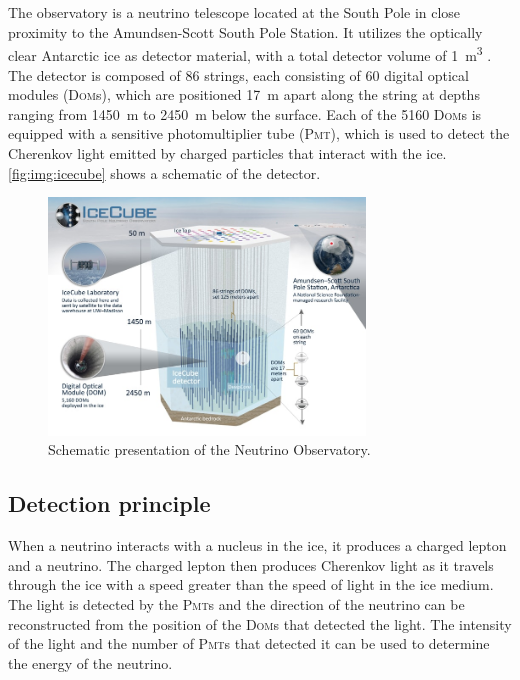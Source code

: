 \section{\icecube}
The \icecube{} observatory is a neutrino telescope located at the South Pole
in close proximity to the Amundsen-Scott South Pole Station.
It utilizes the optically clear Antarctic ice as detector material,
  with a total detector volume of \SI{1}{\cubic\meter} \cite{icecube_facts}.
The detector is composed of \num{86} strings,
  each consisting of \num{60} digital optical modules (\textsc{Dom}s),
    which are positioned
      \SI{17}{\meter} apart along the string
      at depths ranging from \SI{1450}{\meter} to \SI{2450}{\meter} below the surface.
Each of the \num{5160} \textsc{Dom}s is equipped with a sensitive photomultiplier tube (\textsc{Pmt}),
  which is used to detect the Cherenkov light emitted by charged particles
  that interact with the ice.
%
\autoref{fig:img:icecube} shows a schematic of the \icecube{} detector.



\begin{figure}
  \centering
  \includegraphics[width=0.75\textwidth]{content/img/icecube_detector_schematic.jpg}
  \caption{
    Schematic presentation of the \icecube{} Neutrino Observatory. \cite{icecube_homepage}
  }
  \label{fig:img:icecube}
\end{figure}


\subsection{Detection principle}
When a neutrino interacts with a nucleus in the ice,
it produces a charged lepton and a neutrino.
The charged lepton then produces Cherenkov light
  as it travels through the ice
    with a speed greater than the speed of light in the ice medium.
The light is detected by the \textsc{Pmt}s
  and the direction of the neutrino can be reconstructed
  from the position of the \textsc{Dom}s that detected the light.
The intensity of the light and the number of \textsc{Pmt}s that detected it
  can be used to determine the energy of the neutrino.

